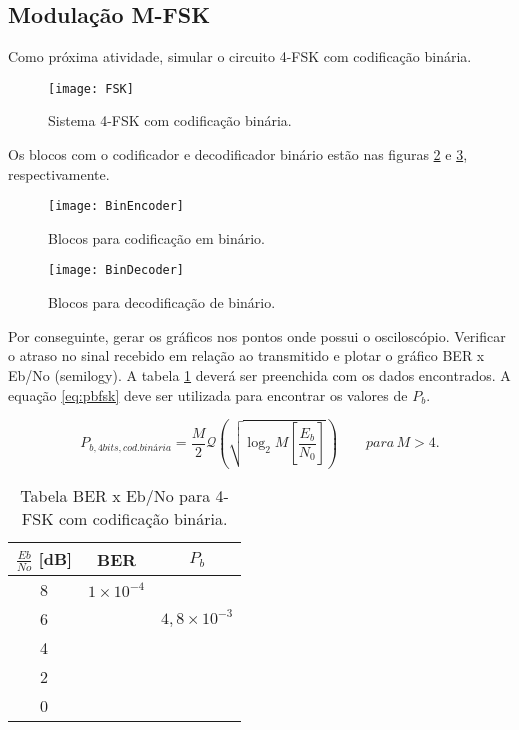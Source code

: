 \subsection{Modulação M-FSK}
Como próxima atividade, simular o circuito 4-FSK com codificação binária.

\begin{figure}[H]
    \centering
    \texttt{[image: FSK]}
    \caption{Sistema 4-FSK com codificação binária.}
    \label{fig:FSK}
\end{figure}

Os blocos com o codificador e decodificador binário estão nas figuras \ref{fig:BinEncoder} e \ref{fig:BinDecoder}, respectivamente.

\begin{figure}[H]
    \centering
    \texttt{[image: BinEncoder]}
    \caption{Blocos para codificação em binário.}
    \label{fig:BinEncoder}
\end{figure}

\begin{figure}[H]
    \centering
    \texttt{[image: BinDecoder]}
    \caption{Blocos para decodificação de binário.}
    \label{fig:BinDecoder}
\end{figure}

Por conseguinte, gerar os gráficos nos pontos onde possui o osciloscópio. Verificar o atraso no sinal recebido em relação ao transmitido e plotar o gráfico BER x Eb/No (semilogy). A tabela \ref{tab:2} deverá ser preenchida com os dados encontrados.
A equação \ref{eq:pbfsk} deve ser utilizada para encontrar os valores de $P_b$.


\begin{equation}
\label{eq:pbfsk}
P_{b,4 bits, cod. binária} = \frac{M}{2}\mathcal{Q}\left(\sqrt{\log_2 M \left[\frac{E_b}{N_0}\right]} \right) \qquad para \, M > 4.
\end{equation}


\begin{small}
    \begin{table}[H]
        \begin{center}
            \caption{Tabela BER x Eb/No para 4-FSK com codificação binária.}
            \begin{tabular}{c|c|c}
                \hline
                $\frac{Eb}{No}$ [dB] & BER & $P_b$ \\
                \hline
                8 & $1 \times 10^{-4}$ & \\
                \hline
                6 & & $4,8 \times 10^{-3}$ \\
                \hline
                4 & & \\
                \hline
                2 & & \\
                \hline
                0 & & \\
                \hline
            \end{tabular}
            \label{tab:2}
        \end{center}
    \end{table}
\end{small}


